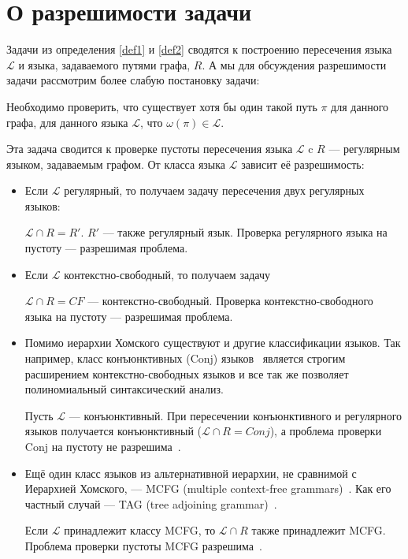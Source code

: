 \section{О разрешимости задачи}

Задачи из определения \ref{def1} и \ref{def2} сводятся к построению пересечения языка $\mathcal{L}$ и языка, задаваемого путями графа, $R$.
А мы для обсуждения разрешимости задачи рассмотрим более слабую постановку задачи:

\begin{definition}
    Необходимо проверить, что существует хотя бы один такой путь $\pi$ для данного графа, для данного языка $\mathcal{L}$, что $\omega(\pi) \in \mathcal{L}$.

\end{definition}

Эта задача сводится к проверке пустоты пересечения языка $\mathcal{L}$ c $R$ --- регулярным языком, задаваемым графом. От класса языка $\mathcal{L}$ зависит её разрешимость:

\begin{itemize}
    \item Если $\mathcal{L}$ регулярный, то получаем задачу пересечения двух регулярных языков:

    $\mathcal{L} \cap R = R'$.
    $R'$ --- также регулярный язык.
    Проверка регулярного языка на пустоту --- разрешимая проблема.

    \item Если $\mathcal{L}$ контекстно-свободный, то получаем задачу

    $\mathcal{L} \cap R = CF$ --- контекстно-свободный.
    Проверка контекстно-свободного языка на пустоту --- разрешимая проблема.

    \item Помимо иерархии Хомского существуют и другие классификации языков.
    Так например, класс конъюнктивных (Conj)
    языков~\cite{DBLP:journals/jalc/Okhotin01}
    является строгим расширением контекстно-свободных языков и все так же позволяет полиномиальный синтаксический анализ.

    Пусть $\mathcal{L}$ --- конъюнктивный. При пересечении конъюнктивного и регулярного языков получается конъюнктивный ($\mathcal{L} \cap R = Conj$), а проблема проверки Conj на пустоту не разрешима~\cite{DBLP:journals/tcs/Okhotin03a}.

    \item Ещё один класс языков из альтернативной иерархии, не сравнимой с Иерархией Хомского, --- MCFG (multiple context-free grammars)~\cite{SEKI1991191}.
    Как его частный случай --- TAG (tree adjoining grammar)~\cite{Joshi1997}.

    Если $\mathcal{L}$ принадлежит классу MCFG, то $\mathcal{L} \cap R$ также принадлежит MCFG. Проблема проверки пустоты MCFG разрешима~\cite{SEKI1991191}.

\end{itemize}

